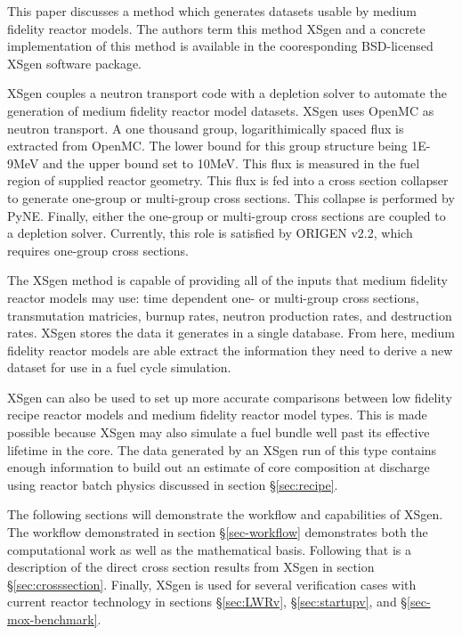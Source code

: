 \documentclass{article}
\begin{document}
This paper discusses a method which generates datasets usable by medium fidelity reactor models.
The authors term this method XSgen and a concrete implementation of this method is available
in the cooresponding BSD-licensed XSgen software package\cite{xsgen}.

XSgen couples a neutron transport code with a depletion solver to automate the generation of
medium fidelity reactor model datasets. XSgen uses OpenMC\cite{openmc} as neutron transport.
A one thousand group, logarithimically spaced flux is extracted from OpenMC. The lower bound for 
this group structure being 1E-9MeV and the upper bound set to 10MeV. This flux is
measured in the fuel region of supplied reactor geometry. This flux is fed into a cross
section collapser to generate one-group or multi-group cross sections. This collapse is
performed by PyNE\cite{pyne}. Finally, either the
one-group or multi-group cross sections are coupled to a depletion solver. Currently, this
role is satisfied by ORIGEN v2.2\cite{origen2}, which requires one-group cross sections.

The XSgen method is capable of providing all of the inputs that medium fidelity reactor models
may use: time dependent one- or multi-group cross sections, transmutation matricies,
burnup rates, neutron production rates, and destruction rates.
XSgen stores the data it generates in a single database.
From here, medium fidelity reactor models are able extract the information they need to
derive a new dataset for use in a fuel cycle simulation.

XSgen can also be used to set up more accurate comparisons between low fidelity recipe reactor
models and medium fidelity reactor model types. This is made possible because XSgen may also
simulate a fuel bundle well past its effective lifetime in the core. The data generated by an
XSgen run of this type contains enough information to build out an estimate of core composition
at discharge using reactor batch physics discussed in section \S\ref{sec:recipe}.

The following sections will demonstrate the workflow and capabilities of XSgen. The workflow demonstrated in section 
\S\ref{sec-workflow} demonstrates 
both the computational work as well as the mathematical basis. Following that is a description of the direct cross 
section results from XSgen in section \S\ref{sec:crosssection}. Finally, XSgen is used for several verification cases with current reactor 
technology in sections \S\ref{sec:LWRv}, \S\ref{sec:startupv}, and \S\ref{sec-mox-benchmark}. 
\end{document}

